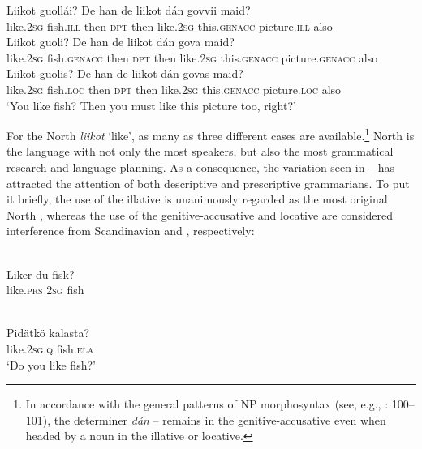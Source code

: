 \documentclass[output=paper]{LSP/langsci}
\begin{document}
\ea{}
\label{16-ki-ex:11}
\ea\label{16-ki-ex:11a}
\gll Liikot guollái? De han de liikot dán govvii maid?\\
 like.\textsc{2sg} fish.\textsc{ill} then \textsc{dpt} then like.\textsc{2sg} this.\textsc{genacc} picture.\textsc{ill} also\\

\ex\label{16-ki-ex:11b}
\gll Liikot guoli? De han de liikot dán gova maid?\\
 like.\textsc{2sg} fish.\textsc{genacc} then \textsc{dpt} then like.\textsc{2sg} this.\textsc{genacc} picture.\textsc{genacc} also\\

\ex\label{16-ki-ex:11c}
\gll Liikot guolis? De han de liikot dán govas maid?\\
 like.\textsc{2sg} fish.\textsc{loc} then \textsc{dpt} then like.\textsc{2sg} this.\textsc{genacc} picture.\textsc{loc} also \\
\glt  ‘You like fish? Then you must like this picture too, right?’
\z
\z

For the North  \textit{liikot} ‘like’, as many as three different cases are available.\footnote{In accordance with the general patterns of NP morphosyntax (see, e.g., \citealt{Sammallahti1998Saami}: 100–101), the determiner \textit{dán} -- remains in the genitive-accusative even when headed by a noun in the illative or locative.} North  is the  language with not only the most speakers, but also the most grammatical research and language planning. As a consequence, the variation seen in -- has attracted the attention of both descriptive and prescriptive grammarians. To put it briefly, the use of the illative  is unanimously regarded as the most original North , whereas the use of the genitive-accusative and locative are considered interference from Scandinavian  and  , respectively:

\begin{exe}
\ex%
\label{16-ki-ex:12}
\\
\gll Liker du fisk?\\
like.\textsc{prs} \textsc{2sg} fish\\
\glt
\end{exe}
 

\begin{exe}
\ex%
\label{16-ki-ex:13}
 \\
\gll Pidätkö kalasta?\\
 like.\textsc{2sg}.\textsc{q} fish.\textsc{ela}\\
\glt  ‘Do you like fish?’
\end{exe}
\end{document}
